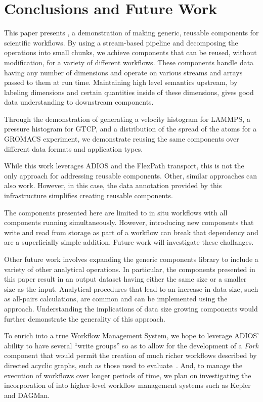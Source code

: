 \section{Conclusions and Future Work}
\label{s:conclusion}

This paper presents \sys, a demonstration of making generic, reusable
components for scientific workflows. By using a stream-based pipeline and decomposing the operations into small
chunks, we achieve components that can be reused, without modification, for
a variety of different workflows. 
These components 
handle data having any number of dimensions
and operate on various streams and arrays
passed to them at run time.
Maintaining high level semantics upstream, by
labeling dimensions and certain quantities inside of these dimensions, gives
good data understanding to downstream components.

Through the demonstration of generating a velocity histogram for LAMMPS,
a pressure histogram for GTCP,
and a distribution of the spread of the atoms for a GROMACS
experiment,
we demonstrate reusing the same components
over different data formats and application types.

While this work leverages ADIOS and the FlexPath transport, this is not the
only approach for addressing reusable components. Other, similar approaches can
also work. However, in this case, the data annotation provided by this
infrastructure simplifies creating reusable components.

The components presented here are limited to in situ workflows with all
components running simultaneously. However, introducing new components that write
and read from storage as part of a workflow can break that dependency and are a
superficially simple addition. Future work will investigate these challanges.

Other future work involves
expanding the generic components library 
to include a variety of other analytical operations.
In particular, the \sys components presented
in this paper
result in an output dataset having either the same
size or a smaller size as the input.
Analytical procedures that lead
to an increase in data size, such as
all-pairs calculations, are common and
can be implemented using the \sys approach. Understanding the implications of
data size growing components would further demonstrate the generality of this
approach.

To enrich \sys into a true Workflow Management
System, we hope to leverage
ADIOS' ability to have several ``write groups''
so as to allow for the development
of a {\em Fork} component
that would permit
the creation of much richer workflows
described by directed acyclic graphs,
such as those used to evaluate~\cite{sim2015analyzethis}.
And, to manage the execution of workflows
over longer periods of time,
we plan on investigating
the incorporation of \sys into
higher-level workflow management systems
such as Kepler and DAGMan.

